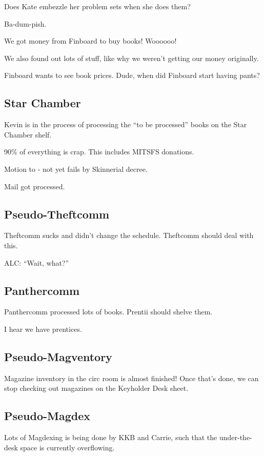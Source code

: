 \documentclass[10pt]{article}
\begin{document}
Does Kate embezzle her problem sets when she does them? 

Ba-dum-pish.

We got money from Finboard to buy books!  Woooooo!

We also found out lots of stuff, like why we weren't getting our money originally.

Finboard wants to see book prices.  Dude, when did Finboard start having pants?

\subsection*{Star Chamber}

Kevin is in the process of processing the ``to be processed'' books on the Star Chamber shelf.

90\% of everything is crap.  This includes MITSFS donations.

Motion to - not yet fails by Skinnerial decree.

Mail got processed.

\subsection*{Pseudo-Theftcomm}

Theftcomm sucks and didn't change the schedule.  Theftcomm should deal with this.

ALC: ``Wait, what?''

\subsection*{Panthercomm}

Panthercomm processed lots of books.  Prentii should shelve them.

I hear we have prentices.

\subsection*{Pseudo-Magventory}
 Magazine inventory in the circ room is almost finished!  Once that's done,
 we can stop checking out magazines on the Keyholder Desk sheet.

\subsection*{Pseudo-Magdex}
 Lots of Magdexing is being done by KKB and Carrie, such that the under-the-desk
 space is currently overflowing. 
\end{document}
